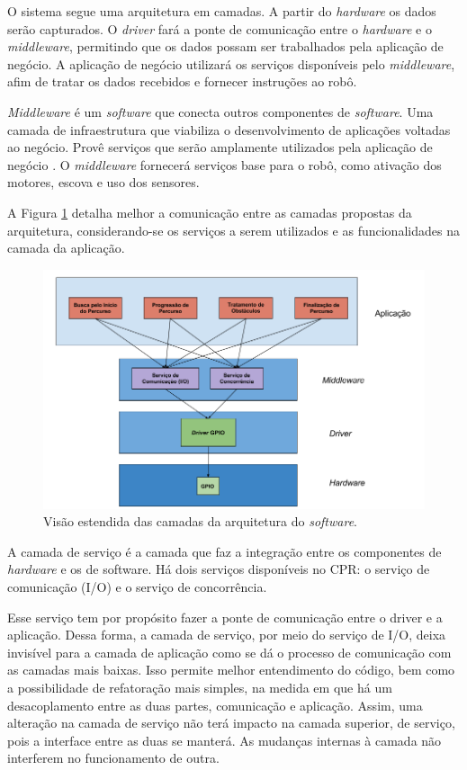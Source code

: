 O sistema segue uma arquitetura em camadas. A partir do \textit{hardware} os dados serão capturados. O \textit{driver} fará a ponte de comunicação entre o \textit{hardware} e o \textit{middleware}, permitindo que os dados possam ser trabalhados pela aplicação de negócio. A aplicação de negócio utilizará os serviços disponíveis pelo \textit{middleware}, afim de tratar os dados recebidos e fornecer instruções ao robô.

\textit{Middleware} é um \textit{software} que conecta outros componentes de \textit{software}. Uma camada de infraestrutura que viabiliza o desenvolvimento de aplicações voltadas ao negócio. Provê serviços que serão amplamente utilizados pela aplicação de negócio \cite{oracle2016}. O \textit{middleware} fornecerá serviços base para o robô, como ativação dos motores, escova e uso dos sensores.

A Figura \ref{fig:layers-soft} detalha melhor a comunicação entre as camadas propostas da arquitetura, considerando-se os serviços a serem utilizados e as funcionalidades na camada da aplicação.

\begin{figure}[h]
  \centering
  \includegraphics[width=\textwidth]{figuras/layers-soft.png}
  \caption{Visão estendida das camadas da arquitetura do \textit{software}.}
  \label{fig:layers-soft}
\end{figure}
\FloatBarrier

A camada de serviço é a camada que faz a integração entre os componentes de \textit{hardware} e os de software. Há dois serviços disponíveis no CPR: o serviço de comunicação (I/O) e o serviço de concorrência.

Esse serviço tem por propósito fazer a ponte de comunicação entre o driver e a aplicação. Dessa forma, a camada de serviço, por meio do serviço de I/O, deixa invisível para a camada de aplicação como se dá o processo de comunicação com as camadas mais baixas. Isso permite melhor entendimento do código, bem como a possibilidade de refatoração mais simples, na medida em que há um desacoplamento entre as duas partes, comunicação e aplicação. Assim, uma alteração na camada de serviço não terá impacto na camada superior, de serviço, pois a interface entre as duas se manterá. As mudanças internas à camada não interferem no funcionamento de outra.

